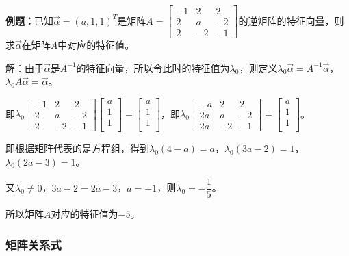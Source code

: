 \documentclass[UTF8, 12pt]{ctexart}
\begin{document}
\textbf{例题：}已知$\overrightarrow{\alpha}=(a,1,1)^T$是矩阵$A=\left[\begin{array}{ccc}
    -1 & 2 & 2 \\
    2 & a & -2 \\
    2 & -2 & -1
\end{array}\right]$的逆矩阵的特征向量，则求$\overrightarrow{\alpha}$在矩阵$A$中对应的特征值。

解：由于$\overrightarrow{\alpha}$是$A^{-1}$的特征向量，所以令此时的特征值为$\lambda_0$，则定义$\lambda_0\overrightarrow{\alpha}=A^{-1}\overrightarrow{\alpha}$，$\lambda_0A\overrightarrow{\alpha}=\overrightarrow{\alpha}$。

即$\lambda_0\left[\begin{array}{ccc}
    -1 & 2 & 2 \\
    2 & a & -2 \\
    2 & -2 & -1
\end{array}\right]\left[\begin{array}{c}
    a \\
    1 \\
    1 \\
\end{array}\right]=\left[\begin{array}{c}
    a \\
    1 \\
    1 \\
\end{array}\right]$，即$\lambda_0\left[\begin{array}{ccc}
    -a & 2 & 2 \\
    2a & a & -2 \\
    2a & -2 & -1
\end{array}\right]=\left[\begin{array}{c}
    a \\
    1 \\
    1 \\
\end{array}\right]$。\medskip

即根据矩阵代表的是方程组，得到$\lambda_0(4-a)=a$，$\lambda_0(3a-2)=1$，$\lambda_0(2a-3)=1$。

又$\lambda_0\neq0$，$3a-2=2a-3$，$a=-1$，则$\lambda_0=-\dfrac{1}{5}$。

所以矩阵$A$对应的特征值为$-5$。

\subsubsection{矩阵关系式}
\end{document}
